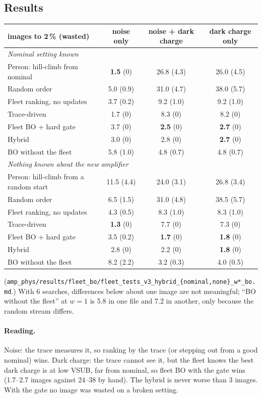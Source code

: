 \documentclass[10pt,a4paper]{article}
\newcommand{\code}[1]{\texttt{\small #1}}
\begin{document}
\subsection{Results}
\begin{center}\small
\begin{tabular}{lccc}\toprule
images to 2\,\% (wasted) & noise only & noise + dark charge & dark charge only\\\midrule
\multicolumn{4}{l}{\textit{Nominal setting known}}\\
Person: hill-climb from nominal & \textbf{1.5} (0) & 26.8 (4.3) & 26.0 (4.5)\\
Random order & 5.0 (0.9) & 31.0 (4.7) & 38.0 (5.7)\\
Fleet ranking, no updates & 3.7 (0.2) & 9.2 (1.0) & 9.2 (1.0)\\
Trace-driven & 1.7 (0) & 8.3 (0) & 8.2 (0)\\
Fleet BO + hard gate & 3.7 (0) & \textbf{2.5} (0) & \textbf{2.7} (0)\\
Hybrid & 3.0 (0) & 2.8 (0) & \textbf{2.7} (0)\\
BO without the fleet & 5.8 (1.0) & 4.8 (0.7) & 4.8 (0.7)\\\midrule
\multicolumn{4}{l}{\textit{Nothing known about the new amplifier}}\\
Person: hill-climb from a random start & 11.5 (4.4) & 24.0 (3.1) & 26.8 (3.4)\\
Random order & 6.5 (1.5) & 31.0 (4.8) & 38.5 (5.7)\\
Fleet ranking, no updates & 4.3 (0.5) & 8.3 (1.0) & 8.3 (1.0)\\
Trace-driven & \textbf{1.3} (0) & 7.7 (0) & 7.3 (0)\\
Fleet BO + hard gate & 3.5 (0.2) & \textbf{1.7} (0) & \textbf{1.8} (0)\\
Hybrid & 2.8 (0) & 2.2 (0) & \textbf{1.8} (0)\\
BO without the fleet & 8.2 (2.2) & 3.2 (0.3) & 4.0 (0.5)\\\bottomrule
\end{tabular}
\end{center}
(\code{amp\_phys/results/fleet\_bo/fleet\_tests\_v3\_hybrid\_\{nominal,none\}\_w*\_bo.md}.) With 6 searches, differences below about
one image are not meaningful; ``BO without the fleet'' at $w=1$ is 5.8 in one file and 7.2 in another, only because the
random stream differs.

\paragraph{Reading.} Noise: the trace measures it, so ranking by the trace (or stepping out from a good nominal) wins.
Dark charge: the trace cannot see it, but the fleet knows the best dark charge is at low VSUB, far from nominal, so fleet BO
with the gate wins (1.7--2.7 images against 24--38 by hand). The hybrid is never worse than 3 images. With the gate no
image was wasted on a broken setting.
\end{document}
